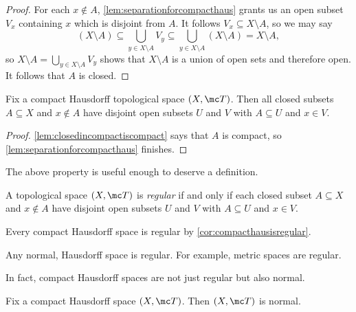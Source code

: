 \documentclass[../notes.tex]{subfiles}
\begin{document}
\begin{proof}
	For each $x\notin A$, \autoref{lem:separationforcompacthaus} grants us an open subset $V_x$ containing $x$ which is disjoint from $A$. It follows $V_x\subseteq X\setminus A$, so we may say
	\[(X\setminus A)\subseteq\bigcup_{y\in X\setminus A}V_y\subseteq\bigcup_{y\in X\setminus A}(X\setminus A)=X\setminus A,\]
	so $X\setminus A=\bigcup_{y\in X\setminus A}V_y$ shows that $X\setminus A$ is a union of open sets and therefore open. It follows that $A$ is closed.
\end{proof}
\begin{corollary} \label{cor:compacthausisregular}
	Fix a compact Hausdorff topological space $(X,\mc T)$. Then all closed subsets $A\subseteq X$ and $x\notin A$ have disjoint open subsets $U$ and $V$ with $A\subseteq U$ and $x\in V$.
\end{corollary}
\begin{proof}
	\autoref{lem:closedincompactiscompact} says that $A$ is compact, so \autoref{lem:separationforcompacthaus} finishes.
\end{proof}
The above property is useful enough to deserve a definition.
\begin{definition}[Regular]
	A topological space $(X,\mc T)$ is \textit{regular} if and only if each closed subset $A\subseteq X$ and $x\notin A$ have disjoint open subsets $U$ and $V$ with $A\subseteq U$ and $x\in V$.
\end{definition}
\begin{example}
	Every compact Hausdorff space is regular by \autoref{cor:compacthausisregular}.
\end{example}
\begin{example}
	Any normal, Hausdorff space is regular. For example, metric spaces are regular.
\end{example}
In fact, compact Hausdorff spaces are not just regular but also normal.
\begin{proposition}
	Fix a compact Hausdorff space $(X,\mc T)$. Then $(X,\mc T)$ is normal.
\end{proposition}
\end{document}
